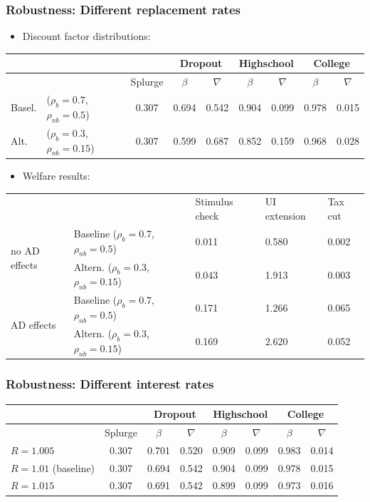 \documentclass[pdflatex,aspectratio=169]{beamer}
\begin{document}
\begin{frame}
\frametitle{Robustness: Different replacement rates}
\centering    
\begin{itemize}
	\item Discount factor distributions: 
\end{itemize}
\small
\begin{tabular}{llc|cccccc} 
	\toprule
	& & & \multicolumn{2}{c}{Dropout} & \multicolumn{2}{c}{Highschool} & \multicolumn{2}{c}{College} \\ \midrule 
	& & Splurge & $\beta$ & $\nabla$ & $\beta$ & $\nabla$ & $\beta$ & $\nabla$ \\ \midrule 
	Basel. & ($\rho_{b}=0.7$, $\rho_{nb}=0.5$) & 0.307 & 0.694 & 0.542 & 0.904 & 0.099 & 0.978 & 0.015 \\ 
	Alt. & ($\rho_{b}=0.3$,  $\rho_{nb}=0.15$) & 0.307 & 0.599 & 0.687 & 0.852 & 0.159 & 0.968 & 0.028
	\\ \bottomrule 
\end{tabular}
\normalsize
\begin{itemize}
\item Welfare results: 
\end{itemize}
\small
\begin{tabular}{@{}lllll@{}}
	\toprule
	&                    & Stimulus check & UI extension & Tax cut \\ \cmidrule(l){1-5} 
	\multirow{2}{*}{no AD effects} 	& Baseline  ($\rho_{b}=0.7$, $\rho_{nb}=0.5$) 		& 0.011          & 0.580        & 0.002   \\
	& Altern.  ($\rho_{b}=0.3$, $\rho_{nb}=0.15$) 	& 0.043          & 1.913        & 0.003   \\ \cmidrule(l){1-5} 
	\multirow{2}{*}{AD effects}		& Baseline  ($\rho_{b}=0.7$, $\rho_{nb}=0.5$)    	& 0.171          & 1.266        & 0.065   \\
	& Altern.  ($\rho_{b}=0.3$, $\rho_{nb}=0.15$)    & 0.169          & 2.620        & 0.052   \\ \cmidrule(l){1-5} 
\end{tabular}
\normalsize
\end{frame}

\begin{frame}
\frametitle{Robustness: Different interest rates}
    \begin{tabular}{lc|cccccc} 
	\toprule
	& & \multicolumn{2}{c}{Dropout} & \multicolumn{2}{c}{Highschool} & \multicolumn{2}{c}{College} \\ \midrule 
	& Splurge & $\beta$ & $\nabla$ & $\beta$ & $\nabla$ & $\beta$ & $\nabla$ \\ \midrule 
	$R = 1.005$ & 0.307 & 0.701 & 0.520 & 0.909 & 0.099 & 0.983 & 0.014 \\
	$R = 1.01$ (baseline) & 0.307 & 0.694 & 0.542 & 0.904 & 0.099 & 0.978 & 0.015 \\ 
	$R = 1.015$ & 0.307 & 0.691 & 0.542 & 0.899 & 0.099 & 0.973 & 0.016 
	\\ \bottomrule 
\end{tabular}
\end{frame}
\end{document}
